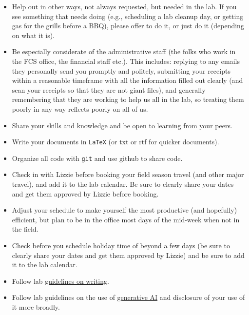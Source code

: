 \documentclass[11pt,a4paper,oneside]{article}
\begin{document}
\begin{itemize}
During your time in the lab you'll be asked to pitch in on various lab tasks and manage various resources. Some examples include: keeping the lab vehicle on top of its inspections and helping with annual reimbursement; managing the lab website and GitHub; help collect long-term lab data; helping design, collect seeds or aid plantings for the common garden/field sites; bring snacks to lab meeting, helping schedule invited speakers, etc.. Please help when asked to contribute to keeping the lab running well. 
\item Help out in other ways, not always requested, but needed in the lab. If you see something that needs doing (e.g., scheduling a lab cleanup day, or getting gas for the grills before a BBQ), please offer to do it, or just do it (depending on what it is). 
\item Be especially considerate of the administrative staff (the folks who work in the FCS office, the financial staff etc.). This includes: replying to any emails they personally send you promptly and politely, submitting your receipts within a reasonable timeframe with all the information filled out clearly (and scan your receipts so that they are not giant files), and generally remembering that they are working to help us all in the lab, so treating them poorly in any way reflects poorly on all of us. 
\item Share your skills and knowledge and be open to learning from your peers. 
\item Write your documents in \verb|LaTeX| (or txt or rtf for quicker documents).
\item Organize all code with \verb|git| and use github to share code.
\item Check in with Lizzie before booking your field season travel (and other major travel), and add it to the lab calendar. Be sure to clearly share your dates and get them approved by Lizzie before booking. 
\item Adjust your schedule to make yourself the most productive (and hopefully) efficient, but plan to be in the office most days of the mid-week when not in the field.
\item Check before you schedule holiday time of beyond a few days (be sure to clearly share your dates and get them approved by Lizzie) and be sure to add it to the lab calendar.
\item Follow lab \href{https://github.com/temporalecologylab/labgit/blob/master/expectations/writing/tempeco_writing.pdf}{guidelines on writing}.
\item Follow lab guidelines on the use of \href{https://github.com/temporalecologylab/labgit/blob/master/expectations/genAI_labguidelines.pdf}{generative AI} and disclosure of your use of it more broadly. 

\end{itemize}
\end{document}
